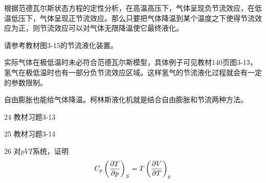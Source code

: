 \documentclass[CJK]{beamer}
\begin{document}
\begin{frame}
\bch
{\small
根据范德瓦尔斯状态方程的定性分析，在高温高压下，气体呈现负节流效应，在低温低压下，气体呈现正节流效应。那么只要把气体降温到某个温度之下使得节流效应为正，则节流效应可以对气体无限降温使它最终液化。

\skiplines

请参考教材图3-15的节流液化装置。

\skiplines

\bitem
\item{实际气体在极低温时未必符合范德瓦尔斯模型，具体例子可见教材140页图3-13，氢气在极低温时也有一部分负节流效应区域。这样氢气的节流液化过程就会有一定的参数限制。}
\item{自由膨胀也能给气体降温。柯林斯液化机就是结合自由膨胀和节流两种方法。}
\eitem

}
\ech
\end{frame}


\begin{frame}
\bch
\bitem
\item[24]{ 教材习题3-13}
\item[25]{ 教材习题3-14}
\item[26]{ 对$pVT$系统，证明
$$C_p \left(\frac{\partial T}{\partial p}\right)_{S} = T \left(\frac{\partial V}{\partial T}\right)_{p} $$ }
\eitem
\ech
\end{frame}
\end{document}
